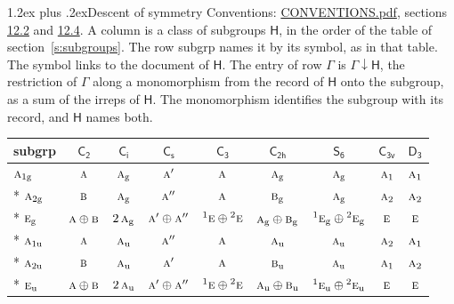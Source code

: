 \documentclass[10pt,a4paper]{article}
\makeatletter
\renewcommand\section{\@startsection{section}{1}{\z@}{-3ex plus -1ex minus -.2ex}%
  {1.2ex plus .2ex}{\normalfont\large\sffamily\bfseries\color{parttitle}}}
\numberwithin{equation}{section}
\newcommand{\grp}[1]{\mathsf{#1}}
\newcommand{\irr}[1]{\text{\normalfont\scshape #1}}
\newcommand{\conjpair}[1]{{}^{#1}}
\newcommand{\ptag}[1]{\mathrm{#1}}
\newcommand{\restr}[2]{#1\!\downarrow#2}
\makeatother
\begin{document}
\section{Descent of symmetry}\label{s:subduction}
Conventions: \href{../../CONVENTIONS.pdf}{CONVENTIONS.pdf}, sections \href{../../CONVENTIONS.pdf\#conv.12.2}{12.2} and \href{../../CONVENTIONS.pdf\#conv.12.4}{12.4}.
A column is a class of subgroups $\grp{H}$, in the order of the table of section~\ref{s:subgroups}. The row subgrp names it by its symbol, as in that table. The symbol links to the document of $\grp{H}$. The entry of row $\Gamma$ is $\restr{\Gamma}{\grp{H}}$, the restriction of $\Gamma$ along a monomorphism from the record of $\grp{H}$ onto the subgroup, as a sum of the irreps of $\grp{H}$. The monomorphism identifies the subgroup with its record, and $\grp{H}$ names both.
{\small\begin{longtable}{@{}lcccccccc@{}}\toprule
subgrp & \href{C2.pdf}{$\grp{C_{2}}$} & \href{S2.pdf}{$\grp{C_{i}}$} & \href{C1v.pdf}{$\grp{C_{s}}$} & \href{C3.pdf}{$\grp{C_{3}}$} & \href{C2h.pdf}{$\grp{C_{2h}}$} & \href{S6.pdf}{$\grp{S_{6}}$} & \href{C3v.pdf}{$\grp{C_{3v}}$} & \href{D3.pdf}{$\grp{D_{3}}$}\\\midrule\endhead
\bottomrule\endfoot\endlastfoot
$\irr{a}_{1\ptag{g}}$ & $\irr{a}$ & $\irr{a}_{\ptag{g}}$ & $\irr{a}'$ & $\irr{a}$ & $\irr{a}_{\ptag{g}}$ & $\irr{a}_{\ptag{g}}$ & $\irr{a}_{1}$ & $\irr{a}_{1}$\\*
$\irr{a}_{2\ptag{g}}$ & $\irr{b}$ & $\irr{a}_{\ptag{g}}$ & $\irr{a}''$ & $\irr{a}$ & $\irr{b}_{\ptag{g}}$ & $\irr{a}_{\ptag{g}}$ & $\irr{a}_{2}$ & $\irr{a}_{2}$\\*
$\irr{e}_{\ptag{g}}$ & $\irr{a}\oplus \irr{b}$ & $2\,\irr{a}_{\ptag{g}}$ & $\irr{a}'\oplus \irr{a}''$ & $\conjpair{1}\irr{e}\oplus \conjpair{2}\irr{e}$ & $\irr{a}_{\ptag{g}}\oplus \irr{b}_{\ptag{g}}$ & $\conjpair{1}\irr{e}_{\ptag{g}}\oplus \conjpair{2}\irr{e}_{\ptag{g}}$ & $\irr{e}$ & $\irr{e}$\\*
$\irr{a}_{1\ptag{u}}$ & $\irr{a}$ & $\irr{a}_{\ptag{u}}$ & $\irr{a}''$ & $\irr{a}$ & $\irr{a}_{\ptag{u}}$ & $\irr{a}_{\ptag{u}}$ & $\irr{a}_{2}$ & $\irr{a}_{1}$\\*
$\irr{a}_{2\ptag{u}}$ & $\irr{b}$ & $\irr{a}_{\ptag{u}}$ & $\irr{a}'$ & $\irr{a}$ & $\irr{b}_{\ptag{u}}$ & $\irr{a}_{\ptag{u}}$ & $\irr{a}_{1}$ & $\irr{a}_{2}$\\*
$\irr{e}_{\ptag{u}}$ & $\irr{a}\oplus \irr{b}$ & $2\,\irr{a}_{\ptag{u}}$ & $\irr{a}'\oplus \irr{a}''$ & $\conjpair{1}\irr{e}\oplus \conjpair{2}\irr{e}$ & $\irr{a}_{\ptag{u}}\oplus \irr{b}_{\ptag{u}}$ & $\conjpair{1}\irr{e}_{\ptag{u}}\oplus \conjpair{2}\irr{e}_{\ptag{u}}$ & $\irr{e}$ & $\irr{e}$\\
\bottomrule\end{longtable}}
\end{document}
